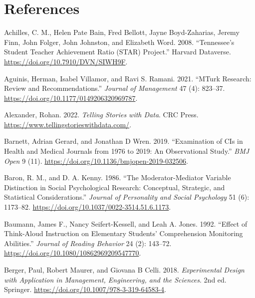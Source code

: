 \documentclass[
  11pt,
  letterpaper,
]{scrbook}
\newlength{\cslhangindent}
\newlength{\cslentryspacingunit} %
\newenvironment{CSLReferences}[2] %
 {%
  \setlength{\parindent}{0pt}
  \ifodd #1
  \let\oldpar\par
  \def\par{\hangindent=\cslhangindent\oldpar}
  \fi
  \setlength{\parskip}{#2\cslentryspacingunit}
 }%
 {}
\theoremstyle{definition}
\theoremstyle{remark}
\begin{document}

\hypertarget{references}{%
\chapter{References}\label{references}}

\hypertarget{refs}{}
\begin{CSLReferences}{1}{0}
\leavevmode{}%
Achilles, C. M., Helen Pate Bain, Fred Bellott, Jayne Boyd-Zaharias,
Jeremy Finn, John Folger, John Johnston, and Elizabeth Word. 2008.
{``Tennessee's Student Teacher Achievement Ratio (STAR) Project.''}
Harvard Dataverse. \url{https://doi.org/10.7910/DVN/SIWH9F}.

\leavevmode{}%
Aguinis, Herman, Isabel Villamor, and Ravi S. Ramani. 2021. {``{MT}urk
Research: Review and Recommendations.''} \emph{Journal of Management} 47
(4): 823--37. \url{https://doi.org/10.1177/0149206320969787}.

\leavevmode{}%
Alexander, Rohan. 2022. \emph{Telling Stories with Data}. CRC Press.
\url{https://www.tellingstorieswithdata.com/}.

\leavevmode{}%
Barnett, Adrian Gerard, and Jonathan D Wren. 2019. {``Examination of
{CI}s in Health and Medical Journals from 1976 to 2019: An Observational
Study.''} \emph{BMJ Open} 9 (11).
\url{https://doi.org/10.1136/bmjopen-2019-032506}.

\leavevmode{}%
Baron, R. M., and D. A. Kenny. 1986. {``The Moderator-Mediator Variable
Distinction in Social Psychological Research: Conceptual, Strategic, and
Statistical Considerations.''} \emph{Journal of Personality and Social
Psychology} 51 (6): 1173--82.
\url{https://doi.org/10.1037/0022-3514.51.6.1173}.

\leavevmode{}%
Baumann, James F., Nancy Seifert-Kessell, and Leah A. Jones. 1992.
{``Effect of Think-Aloud Instruction on Elementary Students'
Comprehension Monitoring Abilities.''} \emph{Journal of Reading
Behavior} 24 (2): 143--72.
\url{https://doi.org/10.1080/10862969209547770}.

\leavevmode{}%
Berger, Paul, Robert Maurer, and Giovana B Celli. 2018.
\emph{Experimental Design with Application in Management, Engineering,
and the Sciences}. 2nd ed. Springer.
\url{https://doi.org/10.1007/978-3-319-64583-4}.


\end{CSLReferences}
\end{document}
